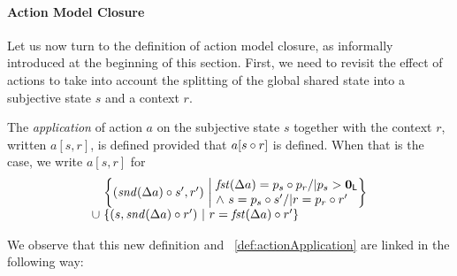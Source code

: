 \paragraph{Action Model Closure}
Let us now turn to the definition of action model closure, as informally introduced at the beginning of this section. First, we need to revisit the effect of actions to take into account the splitting of the global shared state into a subjective state $s$ and a context $r$.
%
%
\begin{definition}\label{def:actionApplicationPair}
The \emph{application} of action $a$ on the subjective state $s$ together with the context $r$, written $a[s,r]$, is defined provided that $a[s \circ r]$ is defined.
%
When that is the case, we write $a[s,r]$ for
\[
\begin{array}{l @{\hspace{3pt}} l}
	& \left\{ 
		\left(\m{snd}(\updateFP{a})\composeL s',r'\right) \ \middle|  
		\begin{array}{@{\hspace{3pt}} l @{} }
			\m{fst}(\updateFP{a}) = p_s\composeL p_r /| p_s > \unitL \\
  		\land\ s = p_s \composeL s' /|   r = p_r \composeL r' 
		\end{array}
	\right\}\\
	\cup&
	\left\{ 
		\left(s, \m{snd}(\updateFP{a})\composeL r'\right) \ \middle|\
  		r = \m{fst}(\updateFP{a}) \composeL r' 
	\right\}
\end{array}
\]
\end{definition}
%
%
\noindent We observe that this new definition and ~\ref{def:actionApplication} are linked in the following way: 
